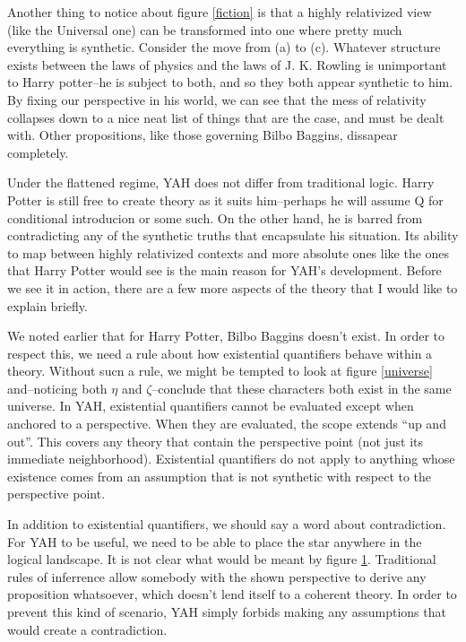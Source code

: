 \documentclass[12pt]{article}
\begin{document}
\begin{flushleft}
Another thing to notice about figure \ref{fiction} is that a highly relativized view (like the Universal one) can be transformed into one where pretty much everything is synthetic.
Consider the move from (a) to (c).
Whatever structure exists between the laws of physics and the laws of J. K. Rowling is unimportant to Harry potter--he is subject to both, and so they both appear synthetic to him.
By fixing our perspective in his world, we can see that the mess of relativity collapses down to a nice neat list of things that are the case, and must be dealt with.
Other propositions, like those governing Bilbo Baggins, dissapear completely.

Under the flattened regime, YAH does not differ from traditional logic.
Harry Potter is still free to create theory as it suits him--perhaps he will assume Q for conditional introducion or some such.
On the other hand, he is barred from contradicting any of the synthetic truths that encapsulate his situation.
Its ability to map between highly relativized contexts and more absolute ones like the ones that Harry Potter would see is the main reason for YAH's development.
Before we see it in action, there are a few more aspects of the theory that I would like to explain briefly.

We noted earlier that for Harry Potter, Bilbo Baggins doesn't exist.
In order to respect this, we need a rule about how existential quantifiers behave within a theory.
Without sucn a rule, we might be tempted to look at figure \ref{universe} and--noticing both $\eta$ and $\zeta$--conclude that these characters both exist in the same universe.
In YAH, existential quantifiers cannot be evaluated except when anchored to a perspective.
When they are evaluated, the scope extends ``up and out''.
This covers any theory that contain the perspective point (not just its immediate neighborhood).
Existential quantifiers do not apply to anything whose existence comes from an assumption that is not synthetic with respect to the perspective point\footnotemark.

\begin{figure}[h]
    \centering
    \hspace*{17em}%
    \fitchprf
    {
    }
    {
        \subproof
        {
        }
        {
            \pline{\bigstar}
        }
    }
    \caption{}
    \label{contradiction}
\end{figure}


In addition to existential quantifiers, we should say a word about contradiction.
For YAH to be useful, we need to be able to place the star anywhere in the logical landscape.
It is not clear what would be meant by figure \ref{contradiction}.
Traditional rules of inferrence allow somebody with the shown perspective to derive any proposition whatsoever, which doesn't lend itself to a coherent theory.
In order to prevent this kind of scenario, YAH simply forbids making any assumptions that would create a contradiction.


\end{flushleft}
\end{document}
